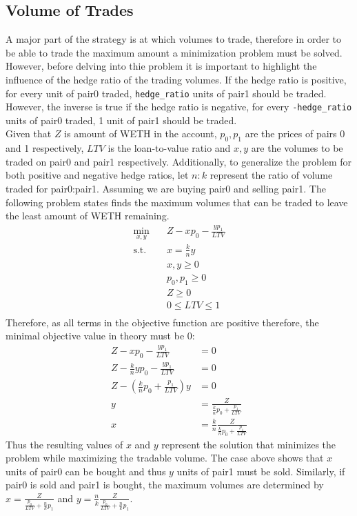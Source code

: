 \subsection{Volume of Trades}
A major part of the strategy is at which volumes to trade, therefore in order to be able to trade the maximum amount a minimization problem must be solved. However, before delving into thie problem it is important to highlight the influence of the hedge ratio of the trading volumes. If the hedge ratio is positive, for every unit of pair0 traded, \texttt{hedge\_ratio} units of pair1 should be traded. However, the inverse is true if the hedge ratio is negative, for every \texttt{-hedge\_ratio} units of pair0 traded, 1 unit of pair1 should be traded.
\\[3mm]
Given that $Z$ is amount of WETH in the account, $p_0, p_1$ are the prices of pairs 0 and 1 respectively, $LTV$ is the loan-to-value ratio and $x, y$ are the volumes to be traded on pair0 and pair1 respectively. Additionally, to generalize the problem for both positive and negative hedge ratios, let $n:k$ represent the ratio of volume traded for pair0:pair1. Assuming we are buying pair0 and selling pair1. The following problem states finds the maximum volumes that can be traded to leave the least amount of WETH remaining.
\begin{equation}
\begin{aligned}
\min_{x, y} \quad & Z - xp_0 - \frac{yp_1}{LTV}\\
\textrm{s.t.} \quad & x = \frac{k}{n}y\\
    &x, y \geq 0\\
    &p_0, p_1 \geq 0\\
    &Z \geq 0\\
    &0 \leq LTV \leq 1\\
\end{aligned}
\end{equation}
Therefore, as all terms in the objective function are positive therefore, the minimal objective value in theory must be 0:
\begin{align*}
    Z - xp_0 - \frac{yp_1}{LTV} &= 0\\
    Z - \frac{k}{n}yp_0 - \frac{yp_1}{LTV} &= 0\\
    Z - (\frac{k}{n}p_0 + \frac{p_1}{LTV})y &= 0\\
    y &= \frac{Z}{\frac{k}{n}p_0 + \frac{p_1}{LTV}}\\
    x &= \frac{k}{n}\frac{Z}{\frac{k}{n}p_0 + \frac{p_1}{LTV}}
\end{align*}
\noindent Thus the resulting values of $x$ and $y$ represent the solution that minimizes the problem while maximizing the tradable volume. The case above shows that $x$ units of pair0 can be bought and thus $y$ units of pair1 must be sold. Similarly, if pair0 is sold and pair1 is bought, the maximum volumes are determined by $x = \frac{Z}{\frac{p_0}{LTV} + \frac{n}{k}p_1}$ and $y = \frac{n}{k} \frac{Z}{\frac{p_0}{LTV} + \frac{n}{k}p_1}$.

